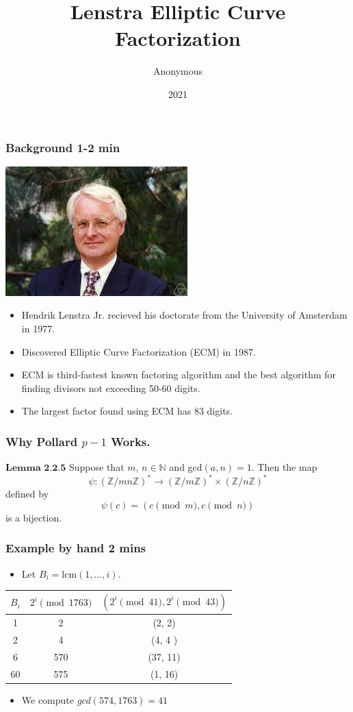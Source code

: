 \documentclass{beamer}
\title{Lenstra Elliptic Curve Factorization}
\author{Anonymous}
\institute{MATH 317}
\date{2021}
\begin{document}
\frame{\titlepage}


\begin{frame}
\frametitle{Background 1-2 min}

\center
\includegraphics[scale = .5]{lenstra.jpeg}

\begin{itemize}
\item Hendrik Lenstra Jr. recieved his doctorate from the University of Amsterdam in 1977.

\item Discovered Elliptic Curve Factorization (ECM) in 1987.

\item ECM is third-fastest known factoring algorithm and the best algorithm for finding divisors not exceeding 50-60 digits.

\item The largest factor found using ECM has 83 digits.
\end{itemize}
\end{frame}

\begin{frame}
\frametitle{Why Pollard $p-1$ Works.}
$\textbf{Lemma 2.2.5}$ Suppose that $m$, $n \in \mathbb{N}$ and gcd$(a,n) = 1$. Then the map
$$
    \psi : \left( \mathbb{Z}/mn\mathbb{Z} \right)^* \rightarrow \left( \mathbb{Z}/m\mathbb{Z} \right)^* \times \left( \mathbb{Z}/n\mathbb{Z} \right)^*
$$
defined by
$$
    \psi(c) = (c \pmod{m}, c\pmod{n})
$$
is a bijection.

\end{frame}


\begin{frame}
\frametitle{Example by hand 2 mins}

\begin{itemize}
\item Let $B_i = \text{lcm}(1,\ldots, i)$.
\end{itemize}

\center
\begin{tabular}{c|c|c}

$B_i$ & $2^i \pmod{1763} $& $(2^i \pmod{41}, 2^i \pmod{43})$ \\
\hline
1 & 2 & (2,  2) \\
2 & 4 &  (4, 4 )\\
6 &570 & (37, 11) \\
60 & 575 & (1, 16)
\end{tabular}

\begin{itemize}
\item We compute $gcd(574, 1763) = 41$
\end{itemize}
\end{frame}
\end{document}
